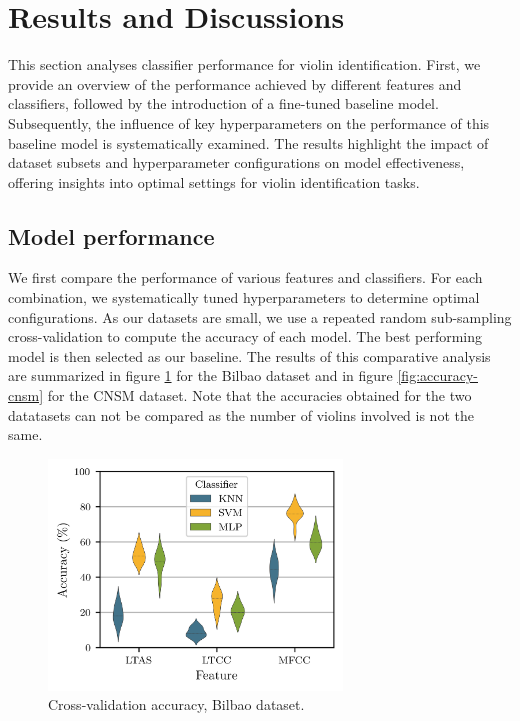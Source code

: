 \documentclass[11pt]{article}
\begin{document}
\section{Results and Discussions}\label{sec:results}

This section analyses classifier performance for violin identification. First, we provide an overview of the performance achieved by different features and classifiers, followed by the introduction of a fine-tuned baseline model. Subsequently, the influence of key hyperparameters on the performance of this baseline model is systematically examined. The results highlight the impact of dataset subsets and hyperparameter configurations on model effectiveness, offering insights into optimal settings for violin identification tasks.

\subsection{Model performance}

We first compare the performance of various features and classifiers. For each combination, we systematically tuned hyperparameters to determine optimal configurations. As our datasets are small, we use a repeated random sub-sampling cross-validation to compute the accuracy of each model. The best performing model is then selected as our baseline. The results of this comparative analysis are summarized in figure \ref{fig:accuracy-bilbao} for the Bilbao dataset and in figure \ref{fig:accuracy-cnsm} for the CNSM dataset. Note that the accuracies obtained for the two datatasets can not be compared as the number of violins involved is not the same.

\begin{figure}[!ht]
  \centerline{
      \includegraphics[width=7.8cm]{figures/accuracy-bilbao.png}
  }
  \caption{Cross-validation accuracy, Bilbao dataset.}
  \label{fig:accuracy-bilbao}
\end{figure}
\end{document}

